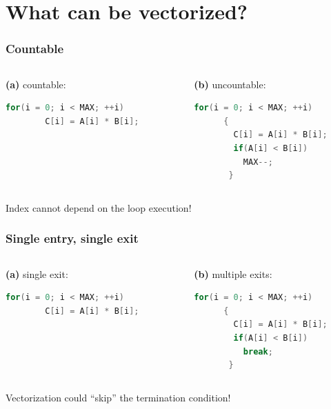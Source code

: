 \documentclass{beamer}
\begin{document}
\section{What can be vectorized?}

\begin{frame}[fragile]
  \frametitle{Countable}
    \begin{columns}[onlytextwidth]
      \begin{column}{0.5\textwidth}
	 \textbf{(a)} countable:
	 \begin{lstlisting}[language=C++]
	  for(i = 0; i < MAX; ++i) 
	    C[i] = A[i] * B[i];   
	\end{lstlisting}
      \end{column}
      \begin{column}{0.5\textwidth}
	\textbf{(b)} uncountable:
	\begin{lstlisting}[language=C++]
	  for(i = 0; i < MAX; ++i) 
	  {
	    C[i] = A[i] * B[i];
	    if(A[i] < B[i])
	      MAX--;
	   }
	\end{lstlisting}
      \end{column}
    \end{columns}
    
    Index cannot depend on the loop execution!   
\end{frame}

\begin{frame}[fragile]
  \frametitle{Single entry, single exit}
    \begin{columns}[onlytextwidth]
      \begin{column}{0.5\textwidth}
	 \textbf{(a)} single exit:
	 \begin{lstlisting}[language=C++]
	  for(i = 0; i < MAX; ++i) 
	    C[i] = A[i] * B[i];   
	\end{lstlisting}
      \end{column}
      \begin{column}{0.5\textwidth}
	\textbf{(b)} multiple exits:
	\begin{lstlisting}[language=C++]
	  for(i = 0; i < MAX; ++i) 
	  {
	    C[i] = A[i] * B[i];
	    if(A[i] < B[i])
	      break;
	   }
	\end{lstlisting}
      \end{column}
    \end{columns}
    
    Vectorization could ``skip'' the termination condition!
\end{frame}
\end{document}
